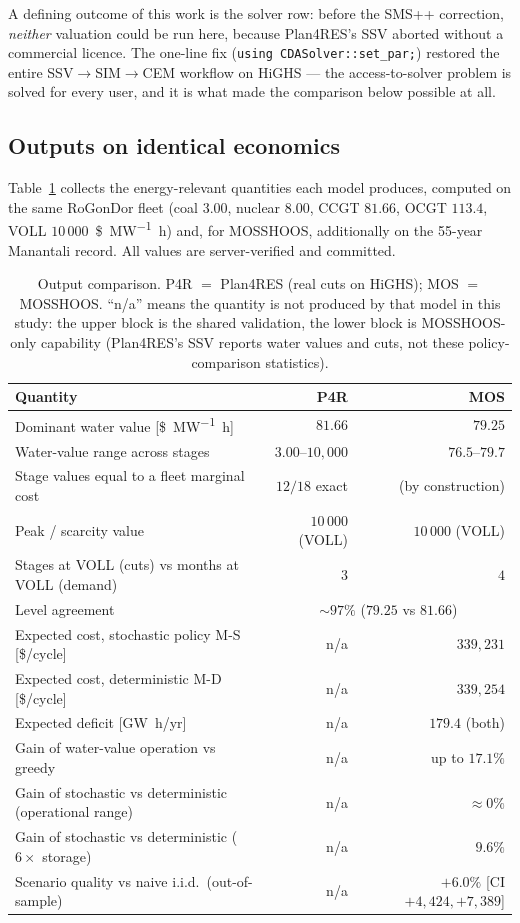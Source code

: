 \documentclass[12pt,a4paper]{article}
\begin{document}
A defining outcome of this work is the solver row: before the SMS++ correction,
\emph{neither} valuation could be run here, because Plan4RES's SSV aborted
without a commercial licence. The one-line fix
(\texttt{using CDASolver::set\_par;}) restored the entire
SSV$\rightarrow$SIM$\rightarrow$CEM workflow on HiGHS --- the access-to-solver
problem is solved for every user, and it is what made the comparison below
possible at all.

\subsection{Outputs on identical economics}

Table~\ref{tab:outcomp} collects the energy-relevant quantities each model
produces, computed on the same RoGonDor fleet (coal $3.00$, nuclear $8.00$, CCGT
$81.66$, OCGT $113.4$, VOLL $10\,000$~\si{\$\per\mega\watt\hour}) and, for
MOSSHOOS, additionally on the 55-year Manantali record. All values are
server-verified and committed.

\begin{table}[h]\centering
\caption{Output comparison. P4R $=$ Plan4RES (real cuts on HiGHS); MOS $=$
MOSSHOOS. ``n/a'' means the quantity is not produced by that model in this
study: the upper block is the shared validation, the lower block is
MOSSHOOS-only capability (Plan4RES's SSV reports water values and cuts, not
these policy-comparison statistics).}
\label{tab:outcomp}
\small
\begin{tabular}{p{}rr}
\toprule
\textbf{Quantity} & \textbf{P4R} & \textbf{MOS} \\
\midrule
Dominant water value [\si{\$\per\mega\watt\hour}] & $81.66$ & $79.25$ \\
Water-value range across stages & $3.00$--$10{,}000$ & $76.5$--$79.7$ \\
Stage values equal to a fleet marginal cost & $12/18$ exact & (by construction) \\
Peak / scarcity value & $10\,000$ (VOLL) & $10\,000$ (VOLL) \\
Stages at VOLL (cuts) vs months at VOLL (demand) & $3$ & $4$ \\
Level agreement & \multicolumn{2}{c}{$\sim\!97\%$ ($79.25$ vs $81.66$)} \\
\midrule
Expected cost, stochastic policy M-S [\$/cycle] & n/a & $339{,}231$ \\
Expected cost, deterministic M-D [\$/cycle] & n/a & $339{,}254$ \\
Expected deficit [\si{\giga\watt\hour}/yr] & n/a & $179.4$ (both) \\
Gain of water-value operation vs greedy & n/a & up to $17.1\%$ \\
Gain of stochastic vs deterministic (operational range) & n/a & $\approx 0\%$ \\
Gain of stochastic vs deterministic ($6\times$ storage) & n/a & $9.6\%$ \\
Scenario quality vs naive i.i.d.\ (out-of-sample) & n/a & $+6.0\%$
[CI $+4{,}424,+7{,}389$] \\
\bottomrule
\end{tabular}
\end{table}
\end{document}
